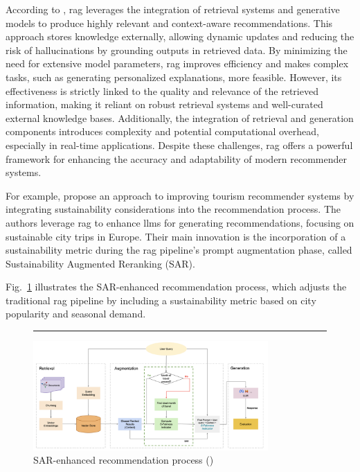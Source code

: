 According to \textcite{Deldjoo2024}, \gls{rag} leverages the integration of retrieval systems and generative models to produce highly relevant and context-aware recommendations.
This approach stores knowledge externally, allowing dynamic updates and reducing the risk of hallucinations by grounding outputs in retrieved data.
By minimizing the need for extensive model parameters, \gls{rag} improves efficiency and makes complex tasks, such as generating personalized explanations, more feasible.
However, its effectiveness is strictly linked to the quality and relevance of the retrieved information, making it reliant on robust retrieval systems and well-curated external knowledge bases.
Additionally, the integration of retrieval and generation components introduces complexity and potential computational overhead, especially in real-time applications.
Despite these challenges, \gls{rag} offers a powerful framework for enhancing the accuracy and adaptability of modern recommender systems.

For example, \textcite{Banerjee2024} propose an approach to improving tourism recommender systems by integrating sustainability considerations into the recommendation process.
The authors leverage \gls{rag} to enhance \glspl{llm} for generating recommendations, focusing on sustainable city trips in Europe.
Their main innovation is the incorporation of a sustainability metric during the \gls{rag} pipeline's prompt augmentation phase, called Sustainability Augmented Reranking (SAR).

Fig.~\ref{fig:sar-enhanced-recommendation} illustrates the SAR-enhanced recommendation process, which adjusts the traditional \gls{rag} pipeline by including a sustainability metric based on city popularity and seasonal demand.

\begin{figure}[htbp]
    \centering
    \rule{35em}{0.5pt}
    \includegraphics[width=0.8\textwidth]{03_Figures/literature-review/rag-tourism.png}
    \caption{SAR-enhanced recommendation process (\textcite{Banerjee2024})}
 \label{fig:sar-enhanced-recommendation}
\end{figure}

